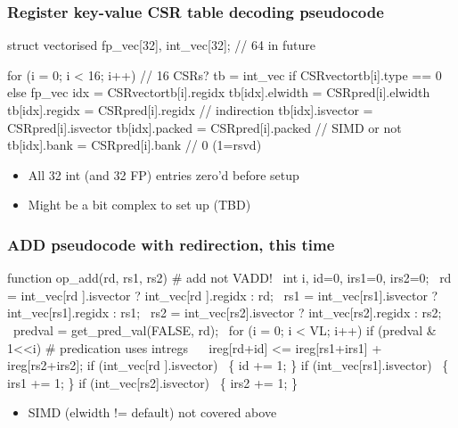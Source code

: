 \documentclass[slidestop]{beamer}
\begin{document}
\begin{frame}[fragile]
\frametitle{Register key-value CSR table decoding pseudocode}

\begin{semiverbatim}
struct vectorised fp\_vec[32], int\_vec[32]; // 64 in future

for (i = 0; i < 16; i++) // 16 CSRs?
   tb = int\_vec if CSRvectortb[i].type == 0 else fp\_vec
   idx = CSRvectortb[i].regidx
   tb[idx].elwidth  = CSRpred[i].elwidth
   tb[idx].regidx   = CSRpred[i].regidx  // indirection
   tb[idx].isvector = CSRpred[i].isvector
   tb[idx].packed   = CSRpred[i].packed  // SIMD or not
   tb[idx].bank     = CSRpred[i].bank    // 0 (1=rsvd)
\end{semiverbatim}

 \begin{itemize}
   \item All 32 int (and 32 FP) entries zero'd before setup
   \item Might be a bit complex to set up (TBD)
  \end{itemize}

\end{frame}


\begin{frame}[fragile]
\frametitle{ADD pseudocode with redirection, this time}

\begin{semiverbatim}
function op\_add(rd, rs1, rs2) # add not VADD!
  int i, id=0, irs1=0, irs2=0;
  rd  = int\_vec[rd ].isvector ? int\_vec[rd ].regidx : rd;
  rs1 = int\_vec[rs1].isvector ? int\_vec[rs1].regidx : rs1;
  rs2 = int\_vec[rs2].isvector ? int\_vec[rs2].regidx : rs2;
  predval = get\_pred\_val(FALSE, rd);
  for (i = 0; i < VL; i++)
    if (predval \& 1<<i) # predication uses intregs
       ireg[rd+id] <= ireg[rs1+irs1] + ireg[rs2+irs2];
    if (int\_vec[rd ].isvector)  \{ id += 1; \}
    if (int\_vec[rs1].isvector)  \{ irs1 += 1; \}
    if (int\_vec[rs2].isvector)  \{ irs2 += 1; \}
\end{semiverbatim}

  \begin{itemize}
   \item SIMD (elwidth != default) not covered above
  \end{itemize}
\end{frame}
\end{document}
